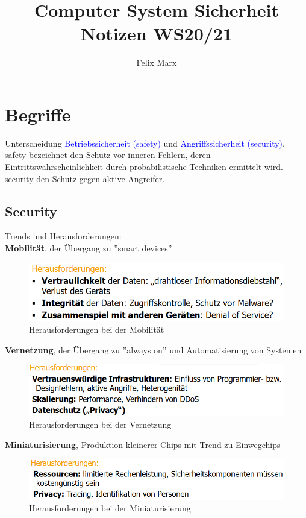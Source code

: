 \documentclass[a4paper,12pt]{article}
\title{Computer System Sicherheit\\Notizen WS20/21}
\author{Felix Marx}
\newcommand{\blue}[1]{\textcolor{blue}{#1}}
\begin{document}
\maketitle

{
\hypersetup{linkcolor=black}
\tableofcontents
}
\newpage

\section{Begriffe}
Unterscheidung \blue{Betriebssicherheit (safety)} und \blue{Angriffssicherheit (security)}.\\
safety bezeichnet den Schutz vor inneren Fehlern, deren Eintrittswahrscheinlichkeit durch probabilistische Techniken ermittelt wird.\\
security den Schutz gegen aktive Angreifer.

\subsection{Security}

Trends und Herausforderungen:\\
\textbf{Mobilität}, der Übergang zu ''smart devices''
\begin{figure}[h!]
\centering
\includegraphics[scale=0.6]{Grafiken/Trend-Mobilitaet.png}
\caption{Herausforderungen bei der Mobilität}
\end{figure}

\textbf{Vernetzung}, der Übergang zu ''always on'' und Automatisierung von Systemen
\begin{figure}[h!]
\centering
\includegraphics[scale=0.6]{Grafiken/Trend-Vernetzung.png}
\caption{Herausforderungen bei der Vernetzung}
\end{figure}

\textbf{Miniaturisierung}, Produktion kleinerer Chips mit Trend zu Einwegchips
\begin{figure}[h!]
\centering
\includegraphics[scale=0.6]{Grafiken/Trend-Miniaturisierung.png}
\caption{Herausforderungen bei der Miniaturisierung}
\end{figure}\\
\end{document}
